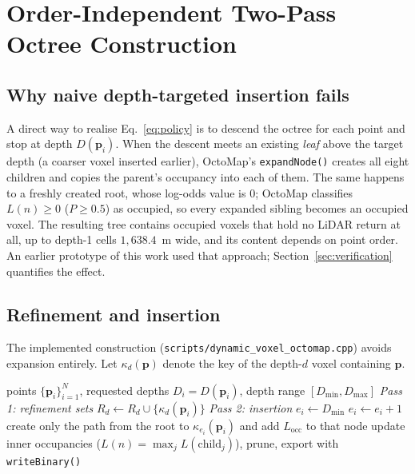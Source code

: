\documentclass[11pt,a4paper]{report}
\begin{document}
\section{Order-Independent Two-Pass Octree Construction}

\subsection{Why naive depth-targeted insertion fails}
A direct way to realise Eq.~\eqref{eq:policy} is to descend the octree for each point and stop at depth $D(\mathbf{p}_i)$. When the descent meets an existing \emph{leaf} above the target depth (a coarser voxel inserted earlier), OctoMap's \texttt{expandNode()} creates all eight children and copies the parent's occupancy into each of them. The same happens to a freshly created root, whose log-odds value is $0$; OctoMap classifies $L(n) \ge 0$ ($P \ge 0.5$) as occupied, so every expanded sibling becomes an occupied voxel. The resulting tree contains occupied voxels that hold no LiDAR return at all, up to depth-1 cells $1{,}638.4$~m wide, and its content depends on point order. An earlier prototype of this work used that approach; Section~\ref{sec:verification} quantifies the effect.

\subsection{Refinement and insertion}
The implemented construction (\texttt{scripts/dynamic\_voxel\_octomap.cpp}) avoids expansion entirely. Let $\kappa_d(\mathbf{p})$ denote the key of the depth-$d$ voxel containing $\mathbf{p}$.

\begin{algorithm}[H]
\caption{Two-pass adaptive octree construction}
\label{alg:twopass}
\begin{algorithmic}[1]
\Require points $\{\mathbf{p}_i\}_{i=1}^{N}$, requested depths $D_i = D(\mathbf{p}_i)$, depth range $[D_{\min}, D_{\max}]$
\Statex \textit{Pass 1: refinement sets}
        \State $R_d \gets R_d \cup \{\kappa_d(\mathbf{p}_i)\}$ 
    \EndFor
\EndFor
\Statex \textit{Pass 2: insertion}
    \State $e_i \gets D_{\min}$
        \State $e_i \gets e_i + 1$
    \EndWhile
    \State create only the path from the root to $\kappa_{e_i}(\mathbf{p}_i)$ and add $L_{\text{occ}}$ to that node
\EndFor
\State update inner occupancies ($L(n) = \max_j L(\text{child}_j)$), prune, export with \texttt{writeBinary()}
\end{algorithmic}
\end{algorithm}
\end{document}
